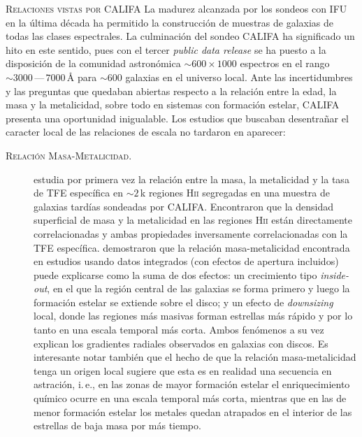 \documentclass[xcolor=dvipsnames,4pt,hyperref={colorlinks,citecolor=black,linkcolor=black,urlcolor=black}]{beamer}
\begin{document}
\begin{frame}[allowframebreaks]{\textsc{Relaciones vistas por CALIFA}}
%
La madurez alcanzada por los sondeos con IFU en la última década ha permitido la construcción de
muestras de galaxias de todas las clases espectrales. La culminación del sondeo CALIFA
\citep{Sanchez2012, Sanchez2016} ha significado un hito en este sentido, pues con el tercer
\emph{public data release} se ha puesto a la disposición de la comunidad astronómica
$\sim600\times1000$ espectros en el rango $\sim3000\,$---$\,7000\,$\AA{} para $\sim600$ galaxias en
el universo local.
Ante las incertidumbres y las preguntas que quedaban abiertas respecto a la relación entre la edad,
la masa y la metalicidad, sobre todo en sistemas con formación estelar, CALIFA presenta una
oportunidad inigualable. Los estudios que buscaban desentrañar el caracter local de las relaciones
de escala no tardaron en aparecer:
%
\begin{description}
%
\item[\textsc{Relación Masa-Metalicidad.}] \citet{Rosales2012} estudia por primera vez la relación
entre la masa, la metalicidad y la tasa de TFE específica en $\sim2\,$k regiones H\textsc{ii}
segregadas en una muestra de galaxias tardías sondeadas por CALIFA.
Encontraron que la densidad superficial de masa y la metalicidad en las regiones H\textsc{ii} están
directamente correlacionadas y ambas propiedades inversamente correlacionadas con la TFE específica.
\citeauthor{Rosales2012} demostraron que la relación masa-metalicidad encontrada en estudios usando
datos integrados (con efectos de apertura incluidos) puede explicarse como la suma de dos efectos:
un crecimiento tipo \emph{inside-out}, en el que la región central de las galaxias se forma primero
y luego la formación estelar se extiende sobre el disco; y un efecto de \emph{downsizing} local,
donde las regiones más masivas forman estrellas más rápido y por lo tanto en una escala temporal más
corta. Ambos fenómenos a su vez explican los gradientes radiales observados en galaxias con discos.
Es interesante notar también que el hecho de que la relación masa-metalicidad tenga un origen local
sugiere que esta es en realidad una secuencia en astración, i.\,e., en las zonas de mayor formación
estelar el enriquecimiento químico ocurre en una escala temporal más corta, mientras que en las de
menor formación estelar los metales quedan atrapados en el interior de las estrellas de baja masa
por más tiempo.


\end{description}
\end{frame}
\end{document}
